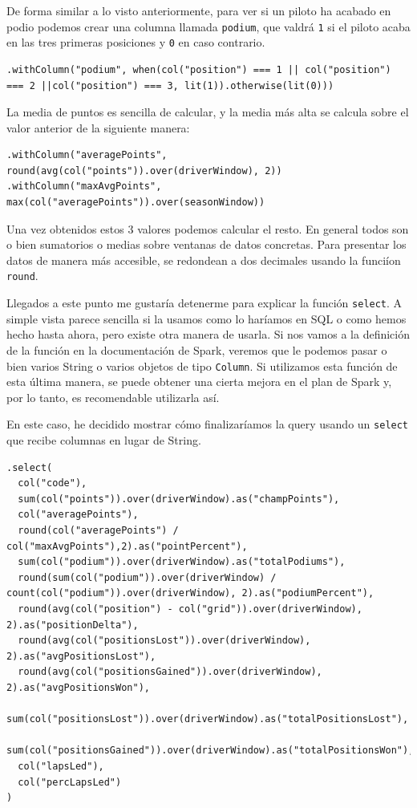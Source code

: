 \documentclass[12pt,twoside,titlepage]{report}
\begin{document}
De forma similar a lo visto anteriormente, para ver si un piloto ha acabado en podio podemos crear una columna llamada \texttt{podium}, que valdrá \texttt{1} si el piloto acaba en las tres primeras posiciones y \texttt{0} en caso contrario.

\begin{lstlisting}
.withColumn("podium", when(col("position") === 1 || col("position") === 2 ||col("position") === 3, lit(1)).otherwise(lit(0)))
\end{lstlisting}

La media de puntos es sencilla de calcular, y la media más alta se calcula sobre el valor anterior de la siguiente manera:

\begin{lstlisting}
.withColumn("averagePoints", round(avg(col("points")).over(driverWindow), 2))
.withColumn("maxAvgPoints", max(col("averagePoints")).over(seasonWindow))
\end{lstlisting}

Una vez obtenidos estos 3 valores podemos calcular el resto. En general todos son o bien sumatorios o medias sobre ventanas de datos concretas. Para presentar los datos de manera más accesible, se redondean a dos decimales usando la funciíon \texttt{round}.

Llegados a este punto me gustaría detenerme para explicar la función \texttt{select}. A simple vista parece sencilla si la usamos como lo haríamos en SQL o como hemos hecho hasta ahora, pero existe otra manera de usarla. Si nos vamos a la definición de la función en la documentación de Spark, veremos que le podemos pasar o bien varios String o varios objetos de tipo \texttt{Column}. Si utilizamos esta función de esta última manera, se puede obtener una cierta mejora en el plan de Spark y, por lo tanto, es recomendable utilizarla así.

En este caso, he decidido mostrar cómo finalizaríamos la query usando un \texttt{select} que recibe columnas en lugar de String. 

\begin{lstlisting}
.select(
  col("code"),
  sum(col("points")).over(driverWindow).as("champPoints"),
  col("averagePoints"),
  round(col("averagePoints") / col("maxAvgPoints"),2).as("pointPercent"),
  sum(col("podium")).over(driverWindow).as("totalPodiums"),
  round(sum(col("podium")).over(driverWindow) / count(col("podium")).over(driverWindow), 2).as("podiumPercent"),
  round(avg(col("position") - col("grid")).over(driverWindow), 2).as("positionDelta"),
  round(avg(col("positionsLost")).over(driverWindow), 2).as("avgPositionsLost"),
  round(avg(col("positionsGained")).over(driverWindow), 2).as("avgPositionsWon"),
  sum(col("positionsLost")).over(driverWindow).as("totalPositionsLost"),
  sum(col("positionsGained")).over(driverWindow).as("totalPositionsWon"),
  col("lapsLed"),
  col("percLapsLed")
)
\end{lstlisting}
\end{document}
